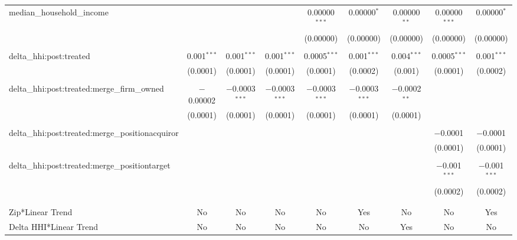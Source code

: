 \begin{table}[H]
{\begin{tabular}{@{\extracolsep{5pt}}lcccccccc}
  median\_household\_income &  &  &  & 0.00000$^{***}$ & 0.00000$^{*}$ & 0.00000$^{**}$ & 0.00000$^{***}$ & 0.00000$^{*}$ \\  

   &  &  &  & (0.00000) & (0.00000) & (0.00000) & (0.00000) & (0.00000) \\  

   & & & & & & & & \\  

  delta\_hhi:post:treated & 0.001$^{***}$ & 0.001$^{***}$ & 0.001$^{***}$ & 0.0005$^{***}$ & 0.001$^{***}$ & 0.004$^{***}$ & 0.0005$^{***}$ & 0.001$^{***}$ \\  

   & (0.0001) & (0.0001) & (0.0001) & (0.0001) & (0.0002) & (0.001) & (0.0001) & (0.0002) \\  

   & & & & & & & & \\  

  delta\_hhi:post:treated:merge\_firm\_owned & $-$0.00002 & $-$0.0003$^{***}$ & $-$0.0003$^{***}$ & $-$0.0003$^{***}$ & $-$0.0003$^{***}$ & $-$0.0002$^{**}$ &  &  \\  

   & (0.0001) & (0.0001) & (0.0001) & (0.0001) & (0.0001) & (0.0001) &  &  \\  

   & & & & & & & & \\  

  delta\_hhi:post:treated:merge\_positionacquiror &  &  &  &  &  &  & $-$0.0001 & $-$0.0001 \\  

   &  &  &  &  &  &  & (0.0001) & (0.0001) \\  

   & & & & & & & & \\  

  delta\_hhi:post:treated:merge\_positiontarget &  &  &  &  &  &  & $-$0.001$^{***}$ & $-$0.001$^{***}$ \\  

   &  &  &  &  &  &  & (0.0002) & (0.0002) \\  

   & & & & & & & & \\  

 \hline \\[-1.8ex]  

 Zip*Linear Trend & No & No & No & No & Yes & No & No & Yes \\  

 Delta HHI*Linear Trend & No & No & No & No & No & Yes & No & No \\  


\end{tabular}}
\end{table}
